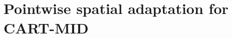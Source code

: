 \documentclass[11pt]{article}
\theoremstyle{plain}
\theoremstyle{definition}
\theoremstyle{remark}
\newtheorem{remark}[theorem]{Remark}
\theoremstyle{plain}
\newcommand{\1}{\mathbbm{1}}
\begin{document}



\section{Pointwise spatial adaptation for CART-MID}
\label{section:multidim-results}
\label{section:upper-bound}

\end{document}
